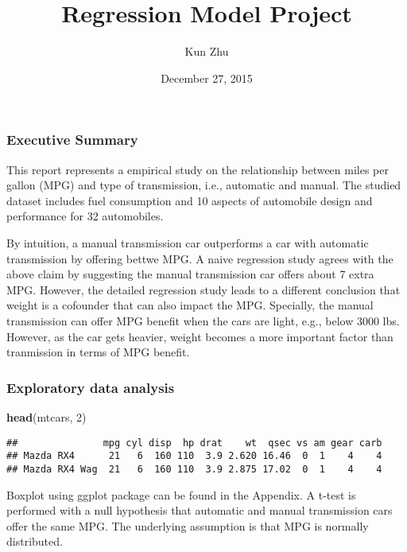 \documentclass[]{article}
\title{Regression Model Project}
\author{Kun Zhu}
\date{December 27, 2015}
\newenvironment{Shaded}{\begin{snugshade}}{\end{snugshade}}
\newcommand{\KeywordTok}[1]{\textcolor[rgb]{0.13,0.29,0.53}{\textbf{{#1}}}}
\newcommand{\DecValTok}[1]{\textcolor[rgb]{0.00,0.00,0.81}{{#1}}}
\newcommand{\NormalTok}[1]{{#1}}
\begin{document}
\maketitle


{
\hypersetup{linkcolor=black}
\setcounter{tocdepth}{2}
\tableofcontents
}
\subsubsection{Executive Summary}\label{executive-summary}

This report represents a empirical study on the relationship between
miles per gallon (MPG) and type of transmission, i.e., automatic and
manual. The studied dataset includes fuel consumption and 10 aspects of
automobile design and performance for 32 automobiles.

By intuition, a manual transmission car outperforms a car with automatic
transmission by offering bettwe MPG. A naive regression study agrees
with the above claim by suggesting the manual transmission car offers
about 7 extra MPG. However, the detailed regression study leads to a
different conclusion that weight is a cofounder that can also impact the
MPG. Specially, the manual transmission can offer MPG benefit when the
cars are light, e.g., below 3000 lbs. However, as the car gets heavier,
weight becomes a more important factor than tranmission in terms of MPG
benefit.

\subsubsection{Exploratory data
analysis}\label{exploratory-data-analysis}

\begin{Shaded}
\begin{Highlighting}[]
\KeywordTok{head}\NormalTok{(mtcars, }\DecValTok{2}\NormalTok{)}
\end{Highlighting}
\end{Shaded}

\begin{verbatim}
##               mpg cyl disp  hp drat    wt  qsec vs am gear carb
## Mazda RX4      21   6  160 110  3.9 2.620 16.46  0  1    4    4
## Mazda RX4 Wag  21   6  160 110  3.9 2.875 17.02  0  1    4    4
\end{verbatim}

Boxplot using ggplot package can be found in the Appendix. A t-test is
performed with a null hypothesis that automatic and manual transmission
cars offer the same MPG. The underlying assumption is that MPG is
normally distributed.
\end{document}
